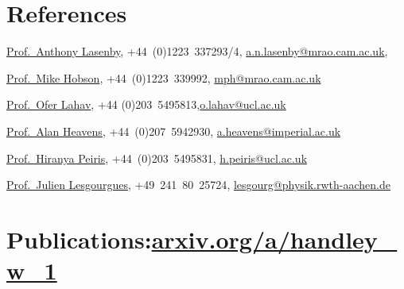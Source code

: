 \documentclass[11pt,a4paper,sans]{moderncv}
\begin{document}
\section{References}
\href{https://www.kicc.cam.ac.uk/directory/anl1000}{Prof.\ Anthony Lasenby}, {+44~(0)1223~337293/4}, \href{mailto:a.n.lasenby@mrao.cam.ac.uk}{a.n.lasenby@mrao.cam.ac.uk}, 

\href{https://www.phy.cam.ac.uk/directory/hobsonm}{Prof.\ Mike Hobson}, {+44~(0)1223~339992}, \href{mailto:mph@mrao.cam.ac.uk}{mph@mrao.cam.ac.uk} 

\href{https://www.ucl.ac.uk/astrophysics/professor-ofer-lahav}{Prof.\ Ofer Lahav}, {+44 (0)203~5495813},\href{mailto:o.lahav@ucl.ac.uk}{o.lahav@ucl.ac.uk} 

\href{https://www.imperial.ac.uk/people/a.heavens}{Prof.\ Alan Heavens}, {+44~(0)207~5942930}, \href{mailto:a.heavens@imperial.ac.uk}{a.heavens@imperial.ac.uk} 

\href{https://www.ucl.ac.uk/cosmoparticle/hiranya-peiris}{Prof.\ Hiranya Peiris}, {+44~(0)203~5495831}, \href{mailto:h.peiris@ucl.ac.uk}{h.peiris@ucl.ac.uk} 

\href{https://www.particle-theory.rwth-aachen.de/go/id/gufe/lidx/1}{Prof.\ Julien Lesgourgues}, {+49~241~80~25724}, \href{mailto:lesgourg@physik.rwth-aachen.de}{lesgourg@physik.rwth-aachen.de} 


\pagebreak
\section{Publications:\hfill  \href{https://arxiv.org/a/handley_w_1.html}{arxiv.org/a/handley\_w\_1}}


{\small
{}
}
\end{document}
